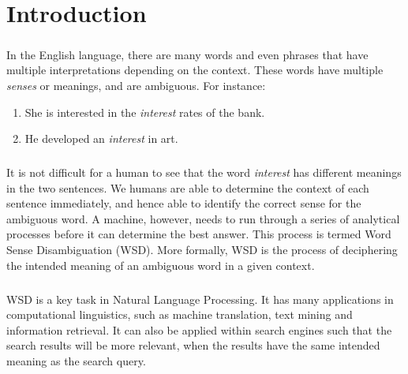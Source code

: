 \chapter{Introduction}
\label{introduction}
\paragraph{}
In the English language, there are many words and even phrases that have multiple interpretations depending on the context. These words have multiple \textit{senses} or meanings, and are ambiguous. For instance:
\begin{enumerate}
\item She is interested in the \textit{interest} rates of the bank.
\item He developed an \textit{interest} in art.
\end{enumerate}

\paragraph{}
It is not difficult for a human to see that the word \textit{interest} has different meanings in the two sentences. We humans are able to determine the context of each sentence immediately, and hence able to identify the correct sense for the ambiguous word. A machine, however, needs to run through a series of analytical processes before it can determine the best answer. This process is termed Word Sense Disambiguation (WSD). More formally, WSD is the process of deciphering the intended meaning of an ambiguous word in a given context.

\paragraph{}
WSD is a key task in Natural Language Processing. It has many applications in computational linguistics, such as machine translation, text mining and information retrieval. It can also be applied within search engines such that the search results will be more relevant, when the results have the same intended meaning as the search query.

